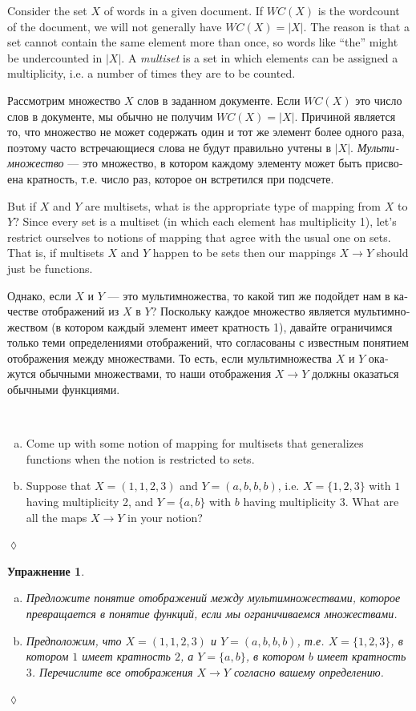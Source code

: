 \documentclass[a4paper]{book}
\def\to{\rightarrow}
\theoremstyle{myth}
\newtheorem{excENG}[envENG]{\begin{english}Exercise\end{english}}
\newenvironment{exerciseENG}{\begin{excENG}}{\hspace*{\fill}$\lozenge$\end{excENG}}
\newtheorem{excRUS}[envRUS]{Упражнение}
\newenvironment{exerciseRUS}{\begin{excRUS}}{\hspace*{\fill}$\lozenge$\end{excRUS}}
\def\sexc{\begin{enumerate}[a.)]\setlength{\itemsep}{.1cm}\setlength{\parskip}{.1cm}\item}
\def\next{\item}
\def\endsexc{\end{enumerate}}
\begin{document}
\begin{russian}
Consider the set $X$ of words in a given document. If $WC(X)$ is the wordcount of the document, we will not generally have $WC(X)=|X|$. The reason is that a set cannot contain the same element more than once, so words like “the” might be undercounted in $|X|$. A {\em multiset} is a set in which elements can be assigned a multiplicity, i.e. a number of times they are to be counted. 

Рассмотрим множество $X$ слов в заданном документе. Если $WC(X)$ это число слов в документе, мы обычно не получим $WC(X)=|X|$. Причиной является то, что множество не может содержать один и тот же элемент более одного раза, поэтому часто встречающиеся слова не будут правильно учтены в $|X|$. {\em Мультимножество} — это множество, в котором каждому элементу может быть присвоена кратность, т.е. число раз, которое он встретился при подсчете. 

But if $X$ and $Y$ are multisets, what is the appropriate type of mapping from $X$ to $Y$? Since every set is a multiset (in which each element has multiplicity 1), let's restrict ourselves to notions of mapping that agree with the usual one on sets. That is, if multisets $X$ and $Y$ happen to be sets then our mappings $X\to Y$ should just be functions.

Однако, если $X$ и $Y$ — это мультимножества, то какой тип же подойдет нам в качестве отображений из $X$ в $Y$? Поскольку каждое множество является мультимножеством (в котором каждый элемент имеет кратность 1), давайте ограничимся только теми определениями отображений, что согласованы с известным понятием отображения между множествами. То есть, если мультимножества $X$ и $Y$ окажутся обычными множествами, то наши отображения $X\to Y$ должны оказаться обычными функциями. 

\begin{exerciseENG}\label{exc:multiset 1}~
\sexc Come up with some notion of mapping for multisets that generalizes functions when the notion is restricted to sets. 
\next Suppose that $X=(1,1,2,3)$ and $Y=(a,b,b,b)$, i.e. $X=\{1,2,3\}$ with $1$ having multiplicity 2, and $Y=\{a,b\}$ with $b$ having multiplicity 3. What are all the maps $X\to Y$ in your notion?
\endsexc
\end{exerciseENG}

\begin{exerciseRUS}\label{exc:multiset 1}~
\sexc Предложите понятие отображений между мультимножествами, которое превращается в понятие функций, если мы ограничиваемся множествами. 
\next Предположим, что $X=(1,1,2,3)$ и $Y=(a,b,b,b)$, т.е. $X=\{1,2,3\}$, в котором $1$ имеет кратность $2$, а $Y=\{a,b\}$, в котором $b$ имеет кратность $3$. Перечислите все отображения $X\to Y$ согласно вашему определению.
\endsexc
\end{exerciseRUS}


\end{russian}
\end{document}
